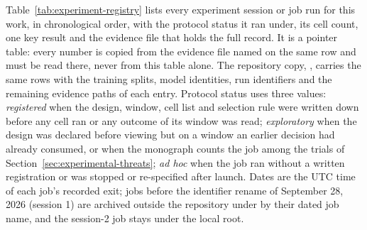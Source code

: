 \begin{apendicesenv}
Table~\ref{tab:experiment-registry} lists every experiment session or job run for this work, in chronological order, with the protocol status it ran under, its cell count, one key result and the evidence file that holds the full record. It is a pointer table: every number is copied from the evidence file named on the same row and must be read there, never from this table alone. The repository copy, , carries the same rows with the training splits, model identities, run identifiers and the remaining evidence paths of each entry. Protocol status uses three values: \emph{registered} when the design, window, cell list and selection rule were written down before any cell ran or any outcome of its window was read; \emph{exploratory} when the design was declared before viewing but on a window an earlier decision had already consumed, or when the monograph counts the job among the trials of Section~\ref{sec:experimental-threats}; \emph{ad hoc} when the job ran without a written registration or was stopped or re-specified after launch. Dates are the UTC time of each job's recorded exit; jobs before the identifier rename of September 28, 2026 (session 1) are archived outside the repository under  by their dated job name, and the session-2 job stays under the local  root.


\end{apendicesenv}
